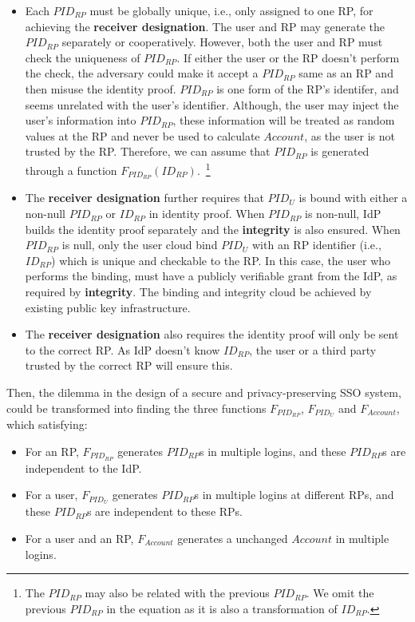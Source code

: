 \begin{itemize}
  \item %
  Each $PID_{RP}$ must be globally unique, i.e., only assigned to one RP,  for achieving the \textbf{receiver designation}.
        The user and RP may generate the $PID_{RP}$ separately or cooperatively.
        However, both the user and RP must check the uniqueness of $PID_{RP}$.
        If either the user or the RP doesn't perform the check, the adversary could make it accept a $PID_{RP}$ same as an RP and then misuse the identity proof.
        $PID_{RP}$ is one form of the RP's identifer, and seems unrelated with the user's identifier.
        Although, the user may inject the user's information into $PID_{RP}$, these information will be treated as random values at the RP and never be used to calculate $Account$, as the user is not trusted by the RP.
        Therefore, we can assume that $PID_{RP}$ is generated through a function $F_{PID_{RP}}(ID_{RP})$.~\footnote{The $PID_{RP}$ may also be related with the previous $PID_{RP}$. We omit the previous $PID_{RP}$ in the equation as it is also a transformation of $ID_{RP}$.}
  \item The \textbf{receiver designation} further requires that  $PID_{U}$ is bound with either a non-null $PID_{RP}$ or $ID_{RP}$ in identity proof.
        When $PID_{RP}$  is non-null, IdP builds the identity proof separately and the \textbf{integrity} is also ensured.
        When $PID_{RP}$  is null, only the user cloud bind $PID_{U}$ with an RP identifier (i.e., $ID_{RP}$) which is unique and checkable to the RP.
        In this case, the user who performs the binding, must have a publicly verifiable grant from the IdP, as required by \textbf{integrity}.
        The binding and integrity cloud be achieved by existing public key infrastructure.
   \item The \textbf{receiver designation} also requires the identity proof will only be sent to the correct RP.
       As IdP doesn't know $ID_{RP}$, the user or a third party trusted by the correct RP will ensure this.
\end{itemize}

Then, the dilemma in the design of a secure and privacy-preserving SSO system, could be transformed into finding the three functions  $F_{PID_{RP}}$,  $F_{PID_{U}}$ and $F_{Account}$, which satisfying:
\begin{itemize}
  \item For an RP, $F_{PID_{RP}}$ generates $PID_{RP}$s in multiple logins, and these  $PID_{RP}$s are independent to the IdP.
  \item For a user, $F_{PID_{U}}$ generates $PID_{RP}$s in multiple logins at different RPs, and these $PID_{RP}$s are independent to these RPs.
  \item For a user and an RP, $F_{Account}$ generates a unchanged $Account$ in multiple logins.
\end{itemize}

